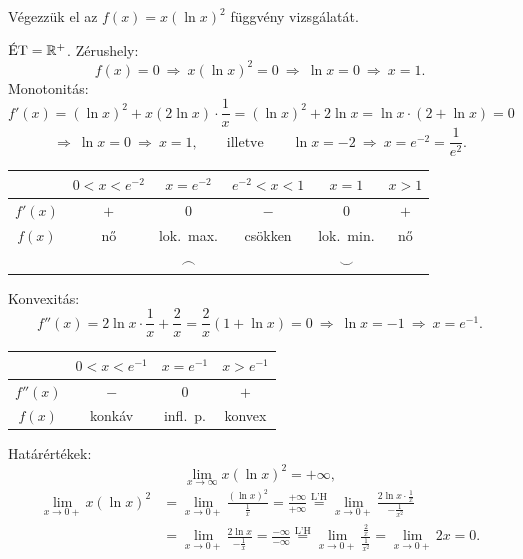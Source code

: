 \documentclass[11pt]{article}
\newcommand{\LH}{\overset{\text{L'H}}{=}}
\newcommand{\signtable}{\renewcommand{\arraystretch}{1.45}}
\begin{document}
\begin{exbox}
\begin{example}
Végezzük el az $f(x)=x(\ln x)^{2}$ függvény vizsgálatát.
\end{example}
\end{exbox}
\begin{solution}
$\ET=\R^{+}$. Zérushely:
\[
f(x)=0\ \Longrightarrow\ x(\ln x)^{2}=0\ \Longrightarrow\ \ln x=0\ \Longrightarrow\ x=1 .
\]
Monotonitás:
\[
f'(x)=(\ln x)^{2}+x(2\ln x)\cdot\frac{1}{x}=(\ln x)^{2}+2\ln x=\ln x\cdot(2+\ln x)=0
\]
\[
\Longrightarrow\ \ln x=0\ \Longrightarrow\ x=1,\qquad\text{illetve}\qquad \ln x=-2\ \Longrightarrow\ x=e^{-2}=\frac{1}{e^{2}}.
\]
\begin{center}
\signtable
\begin{tabular}{c|ccccc}
\hline
 & $0<x<e^{-2}$ & $x=e^{-2}$ & $e^{-2}<x<1$ & $x=1$ & $x>1$\\
\hline
$f'(x)$ & $+$ & $0$ & $-$ & $0$ & $+$\\
$f(x)$ & nő & lok.\ max. & csökken & lok.\ min. & nő\\
 & & {\Large$\frown$} & & {\Large$\smile$} & \\
\hline
\end{tabular}
\end{center}
Konvexitás:
\[
f''(x)=2\ln x\cdot\frac{1}{x}+\frac{2}{x}=\frac{2}{x}(1+\ln x)=0\ \Longrightarrow\ \ln x=-1\ \Longrightarrow\ x=e^{-1}.
\]
\begin{center}
\signtable
\begin{tabular}{c|ccc}
\hline
 & $0<x<e^{-1}$ & $x=e^{-1}$ & $x>e^{-1}$\\
\hline
$f''(x)$ & $-$ & $0$ & $+$\\
$f(x)$ & konkáv & infl.\ p. & konvex\\
\hline
\end{tabular}
\end{center}
Határértékek:
\[
\lim_{x\to\infty}x(\ln x)^{2}=+\infty,
\]
\begin{align*}
\lim_{x\to 0+}x(\ln x)^{2}&=\lim_{x\to 0+}\frac{(\ln x)^{2}}{\frac{1}{x}}=\frac{+\infty}{+\infty}
\LH\lim_{x\to 0+}\frac{2\ln x\cdot\frac{1}{x}}{-\frac{1}{x^{2}}}\\
&=\lim_{x\to 0+}\frac{2\ln x}{-\frac{1}{x}}=\frac{-\infty}{-\infty}
\LH\lim_{x\to 0+}\frac{\frac{2}{x}}{\frac{1}{x^{2}}}=\lim_{x\to 0+}2x=0 .
\end{align*}


\end{solution}
\end{document}
